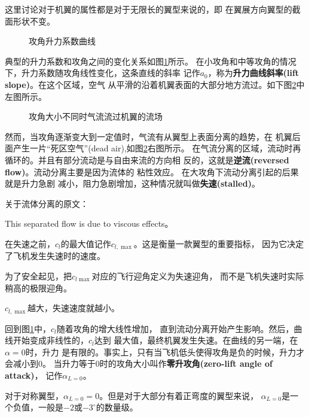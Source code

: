 这里讨论对于机翼的属性都是对于无限长的翼型来说的，即
在翼展方向翼型的截面形状不变。

\begin{figure}[!ht]
	\centering
	
	\caption{攻角升力系数曲线}
	\label{fig:angle_of_attack}
\end{figure}

典型的升力系数和攻角之间的变化关系如图\ref{fig:angle_of_attack}所示。
在小攻角和中等攻角的情况下，升力系数随攻角线性变化，这条直线的斜率
记作$a_0$，称为{\bfseries 升力曲线斜率(lift slope)}。在这个区域，空气
从平滑的沿着机翼表面的大部分地方流过。如下图\ref{fig:separate}中左图所示。
\begin{figure}[!ht]
	\centering
	
	\caption{攻角大小不同时气流流过机翼的流场}
	\label{fig:separate}
\end{figure}
然而，当攻角逐渐变大到一定值时，气流有从翼型上表面分离的趋势，在
机翼后面产生一片“死区空气”(dead air),如图\ref{fig:separate}右图所示。
在气流分离的区域，流动时再循环的。并且有部分流动是与自由来流的方向相
反的，这就是{\bfseries 逆流(reversed flow)}。流动分离主要是因为流体的
粘性效应。
在大攻角下流动分离引起的后果就是{\color{noteorange}升力急剧
减小，阻力急剧增加}，这种情况就叫做{\bfseries 失速(stalled)}。

\begin{notice}
	关于流体分离的原文：

	This separated flow is due to
	viscous effects。
\end{notice}
在失速之前，$c_l$的最大值记作$c_{l,\max}$。这是衡量一款翼型的重要指标，
因为它决定了飞机发生失速时的速度。

为了安全起见，把$c_{l \max}$对应的飞行迎角定义为失速迎角，
而不是飞机失速时实际稍高的极限迎角。
\begin{notice}
	$c_{l,\max}$越大，失速速度就越小。
\end{notice}
回到图\ref{fig:angle_of_attack}中，$c_l$随着攻角的增大线性增加，
直到流动分离开始产生影响。然后，曲线开始变成非线性的，$c_l$达到
最大值，最终机翼发生失速。在曲线的另一端，在$\alpha=0$时，升力
是有限的。事实上，只有当飞机低头使得攻角是负的时候，升力才会减小到0。
当升力等于0时的攻角大小叫作{\bfseries 零升攻角(zero-lift angle of attack)}，
记作$\alpha_{L=0}$。
\begin{notice}
	对于对称翼型，$\alpha_{L=0}=0$。但是对于大部分有着正弯度的翼型来说，
	$\alpha_{L=0}$是一个负值，一般是$-2$或$-3^{\circ}$的数量级。
\end{notice}

